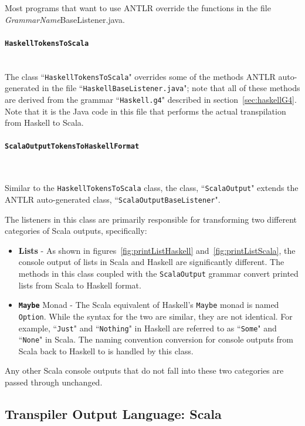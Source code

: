 \documentclass{report}
\newcommand{\myparagraph}[1]{\paragraph{#1}\mbox{}\\}
\begin{document}
Most programs that want to use ANTLR override the functions in the file \emph{GrammarName}BaseListener.java.


\myparagraph{\texttt{HaskellTokensToScala}}

The class ``\texttt{HaskellTokensToScala}" overrides some of the methods ANTLR auto-generated in the file ``\texttt{HaskellBaseListener.java}"; note that all of these methods are derived from the grammar ``\texttt{Haskell.g4}" described in section~\ref{sec:haskellG4}.  Note that it is the Java code in this file that performs the actual transpilation from Haskell to Scala.

\myparagraph{\texttt{ScalaOutputTokensToHaskellFormat}}\label{sec:scalaOutputFunctionality}

Similar to the \texttt{HaskellTokensToScala} class, the class, ``\texttt{ScalaOutput}" extends the ANTLR auto-generated class, ``\texttt{ScalaOutputBaseListener}".

The listeners in this class are primarily responsible for transforming two different categories of Scala outputs, specifically:

\begin{itemize}

\item \textbf{Lists} - As shown in figures~\ref{fig:printListHaskell} and~\ref{fig:printListScala}, the console output of lists in Scala and Haskell are significantly different.  The methods in this class coupled with the \texttt{ScalaOutput} grammar convert printed lists from Scala to Haskell format.

\item \textbf{\texttt{Maybe}} Monad - The Scala equivalent of Haskell's \texttt{Maybe} monad is named \texttt{Option}.  While the syntax for the two are similar, they are not identical.  For example, ``\texttt{Just}" and ``\texttt{Nothing}" in Haskell are referred to as ``\texttt{Some}" and ``\texttt{None}" in Scala.  The naming convention conversion for console outputs from Scala back to Haskell to is handled by this class.

\end{itemize}

Any other Scala console outputs that do not fall into these two categories are passed through unchanged.


\subsection{Transpiler Output Language: Scala}
\end{document}
